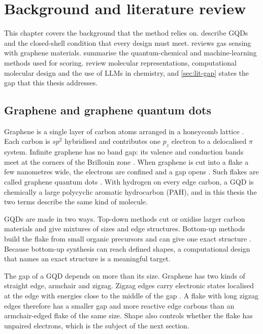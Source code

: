 \chapter{Background and literature review}
\label{ch:literature}

This chapter covers the background that the method relies on. 
describe GQDs and the closed-shell condition that every design must meet. 
reviews gas sensing with graphene materials.  summarise the
quantum-chemical and machine-learning methods used for scoring. 
review molecular representations, computational molecular design and the use of LLMs in chemistry,
and \cref{sec:lit-gap} states the gap that this thesis addresses.

\section{Graphene and graphene quantum dots}
\label{sec:lit-gqd}

Graphene is a single layer of carbon atoms arranged in a honeycomb lattice \cite{novoselov2004}.
Each carbon is \(sp^2\) hybridised and contributes one \(p_z\) electron to a delocalised \(\pi\)
system. Infinite graphene has no band gap: its valence and conduction bands meet at the corners of
the Brillouin zone \cite{castroneto2009}. When graphene is cut into a flake a few nanometres wide,
the electrons are confined and a gap opens \cite{ponomarenko2008}. Such flakes are called graphene
quantum dots \cite{bacon2014gqd}. With hydrogen on every edge carbon, a GQD is chemically a large
polycyclic aromatic hydrocarbon (PAH), and in this thesis the two terms describe the same kind of
molecule.

GQDs are made in two ways. Top-down methods cut or oxidise larger carbon materials and give
mixtures of sizes and edge structures. Bottom-up methods build the flake from small organic
precursors and can give one exact structure \cite{yan2010large,narita2015nanographene}. Because
bottom-up synthesis can reach defined shapes, a computational design that names an exact
structure is a meaningful target.

The gap of a GQD depends on more than its size. Graphene has two kinds of straight edge, armchair
and zigzag. Zigzag edges carry electronic states localised at the edge with energies close to the
middle of the gap \cite{nakada1996edge}. A flake with long zigzag edges therefore has a smaller
gap and more reactive edge carbons than an armchair-edged flake of the same size. Shape also
controls whether the flake has unpaired electrons, which is the subject of the next section.

